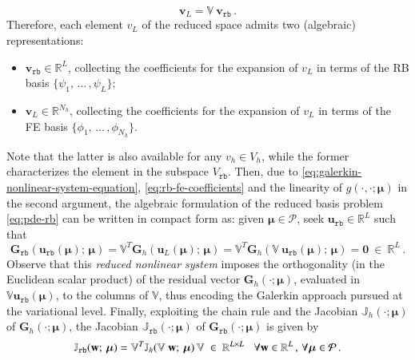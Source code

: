\documentclass{elsarticle}
\numberwithin{equation}{section}
\theoremstyle{theorem}
\theoremstyle{definition}
\theoremstyle{remark}
\theoremstyle{proposition}
\numberwithin{figure}{section}
\newcommand{\bg}[1]{\boldsymbol{#1}}
\begin{document}
		\begin{equation}
			\label{eq:rb-fe-coefficients}
			\mathbf{v}_L = \mathbb{V} ~ \mathbf{v}_{\texttt{rb}} \, .
		\end{equation}
		Therefore, each element $v_{L}$ of the reduced space admits two (algebraic) representations:
		\begin{itemize}
			\item $\mathbf{v}_{\texttt{rb}} \in \mathbb{R}^L$, collecting the coefficients for the expansion of $v_{L}$ in terms of the RB basis $\big\lbrace \psi_1, \, \ldots \, , \psi_L \big\rbrace$;
			\item $\mathbf{v}_{L} \in \mathbb{R}^{N_h}$, collecting the coefficients for the expansion of $v_{L}$ in terms of the FE basis $\big\lbrace \phi_1, \, \ldots \, , \phi_{N_h} \big\rbrace$.
		\end{itemize}
		Note that the latter is also available for any $v_h \in V_h$, while the former characterizes the element in the subspace $V_{\texttt{rb}}$. Then, due to \eqref{eq:galerkin-nonlinear-system-equation}, \eqref{eq:rb-fe-coefficients} and the linearity of $g(\cdot,\cdot; \bg{\mu})$ in the second argument, the algebraic formulation of the reduced basis problem \eqref{eq:pde-rb} can be written in compact form as: given $\bg{\mu} \in \mathcal{P}$, seek $\mathbf{u}_{\texttt{rb}} \in \mathbb{R}^L$ such that
		\begin{equation}
			\label{eq:rb-nonlinear-system}
			\mathbf{G}_{\texttt{rb}}(\mathbf{u}_{\texttt{rb}}(\bg{\mu}); \, \bg{\mu}) = \mathbb{V}^T \mathbf{G}_h(\mathbf{u}_L(\bg{\mu}); \, \bg{\mu}) = \mathbb{V}^T \mathbf{G}_h(\mathbb{V} ~ \mathbf{u}_{\texttt{rb}}(\bg{\mu}); \, \bg{\mu}) = \bg{0} ~ \in ~ \mathbb{R}^L \, .
		\end{equation}
		Observe that this \emph{reduced nonlinear system} imposes the orthogonality (in the Euclidean scalar product) of the residual vector $\mathbf{G}_h(\cdot; \bg{\mu})$, evaluated in $\mathbb{V} \mathbf{u}_{\texttt{rb}}(\bg{\mu})$, to the columns of $\mathbb{V}$, thus encoding the Galerkin approach pursued at the variational level. Finally, exploiting the chain rule and the Jacobian $\mathbb{J}_h(\cdot; \bg{\mu})$ of $\mathbf{G}_h(\cdot; \bg{\mu})$, the Jacobian $\mathbb{J}_{\texttt{rb}}(\cdot; \bg{\mu})$ of $\mathbf{G}_{\texttt{rb}}(\cdot; \bg{\mu})$ is given by
		\begin{equation}
			\label{eq:rb-nonlinear-system-jacobian}
			\mathbb{J}_{\texttt{rb}}(\mathbf{w}; \, \bg{\mu}) = \mathbb{V}^T \mathbb{J}_h(\mathbb{V} ~ \mathbf{w}; \, \bg{\mu}) \, \mathbb{V} ~ \in ~ \mathbb{R}^{L \times L} \hspace*{0.3cm} \forall \mathbf{w} \in \mathbb{R}^L \, , \, \forall \bg{\mu} \in \mathcal{P} \, .
		\end{equation}
\end{document}
